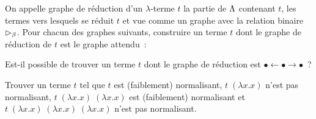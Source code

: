 \begin{exercise}
  On appelle graphe de réduction d'un $\lambda$-terme $t$ la partie de
  $\Lambda$ contenant $t$, les termes vers lesquels se réduit $t$ et vue comme
  un graphe avec la relation binaire $\mathrel{\rhd_{\beta}}$. Pour chacun des graphes suivants,
  construire un terme $t$ dont le graphe de réduction de $t$ est le graphe
  attendu~:
  \begin{center}
    \begin{minipage}{0.35\textwidth}
    \end{minipage}
    \begin{minipage}{0.2\textwidth}
    \end{minipage}
    \begin{minipage}{0.3\textwidth}
    \end{minipage}
  \end{center}
  Est-il possible de trouver un terme $t$ dont le graphe de réduction est
  $\bullet\leftarrow\bullet\rightarrow\bullet$~?
\end{exercise}

\begin{exercise}
  Trouver un terme $t$ tel que $t$ est (faiblement) normalisant,
  $t\;(\lambda x.x)$ n'est pas normalisant, $t\;(\lambda x.x)\;(\lambda x.x)$
  est (faiblement) normalisant et
  $t\;(\lambda x.x)\;(\lambda x.x)\;(\lambda x.x)$ n'est pas normalisant.
\end{exercise}

